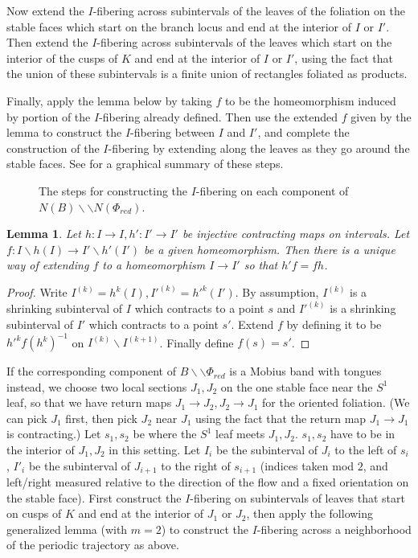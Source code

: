 \documentclass[12pt]{amsart}
\newtheorem{lemma}[thm]{Lemma}
\theoremstyle{definition}
\numberwithin{equation}{section}
\begin{document}
Now extend the $I$-fibering across subintervals of the leaves of the foliation on the stable faces which start on the branch locus and end at the interior of $I$ or $I'$. Then extend the $I$-fibering across subintervals of the leaves which start on the interior of the cusps of $K$ and end at the interior of $I$ or $I'$, using the fact that the union of these subintervals is a finite union of rectangles foliated as products.

Finally, apply the lemma below by taking $f$ to be the homeomorphism induced by portion of the $I$-fibering already defined. Then use the extended $f$ given by the lemma to construct the $I$-fibering between $I$ and $I'$, and complete the construction of the $I$-fibering by extending along the leaves as they go around the stable faces. See  for a graphical summary of these steps.

\begin{figure}
    \centering
    \fontsize{16pt}{16pt}\selectfont
    \resizebox{!}{6cm}{}
    \caption{The steps for constructing the $I$-fibering on each component of $N(B) \backslash \backslash N(\Phi_{red})$.}
    \label{fig:stableglue2}
\end{figure}

\begin{lemma} \label{lemma:expandextendbb}
Let $h:I \to I, h': I' \to I'$ be injective contracting maps on intervals. Let $f:I \backslash h(I) \to I' \backslash h'(I')$ be a given homeomorphism. Then there is a unique way of extending $f$ to a homeomorphism $I \to I'$ so that $h' f=f h$.
\end{lemma}
\begin{proof}
Write $I^{(k)}=h^k(I), I'^{(k)}=h'^k(I')$. By assumption, $I^{(k)}$ is a shrinking subinterval of $I$ which contracts to a point $s$ and $I'^{(k)}$ is a shrinking subinterval of $I'$ which contracts to a point $s'$. Extend $f$ by defining it to be $h'^k f (h^k)^{-1}$ on $I^{(k)} \backslash I^{(k+1)}$. Finally define $f(s)=s'$.
\end{proof}

If the corresponding component of $B \backslash \backslash \Phi_{red}$ is a Mobius band with tongues instead, we choose two local sections $J_1, J_2$ on the one stable face near the $S^1$ leaf, so that we have return maps $J_1 \to J_2, J_2 \to J_1$ for the oriented foliation. (We can pick $J_1$ first, then pick $J_2$ near $J_1$ using the fact that the return map $J_1 \to J_1$ is contracting.) Let $s_1, s_2$ be where the $S^1$ leaf meets $J_1, J_2$. $s_1, s_2$ have to be in the interior of $J_1, J_2$ in this setting. Let $I_i$ be the subinterval of $J_i$ to the left of $s_i$, $I'_i$ be the subinterval of $J_{i+1}$ to the right of $s_{i+1}$ (indices taken mod $2$, and left/right measured relative to the direction of the flow and a fixed orientation on the stable face). First construct the $I$-fibering on subintervals of leaves that start on cusps of $K$ and end at the interior of $J_1$ or $J_2$, then apply the following generalized lemma (with $m=2$) to construct the $I$-fibering across a neighborhood of the periodic trajectory as above.
\end{document}
